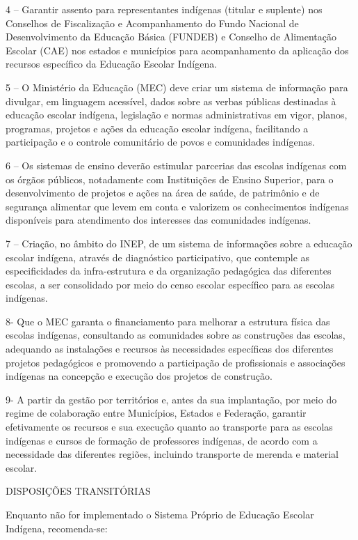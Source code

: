 \documentclass[
]{book}
\begin{document}
4 -- Garantir assento para representantes indígenas (titular e suplente) nos Conselhos de Fiscalização e Acompanhamento do Fundo Nacional de Desenvolvimento da Educação Básica (FUNDEB) e Conselho de Alimentação Escolar (CAE) nos estados e municípios para acompanhamento da aplicação dos recursos específico da Educação Escolar Indígena.

5 -- O Ministério da Educação (MEC) deve criar um sistema de informação para divulgar, em linguagem acessível, dados sobre as verbas públicas destinadas à educação escolar indígena, legislação e normas administrativas em vigor, planos, programas, projetos e ações da educação escolar indígena, facilitando a participação e o controle comunitário de povos e comunidades indígenas.

6 -- Os sistemas de ensino deverão estimular parcerias das escolas indígenas com os órgãos públicos, notadamente com Instituições de Ensino Superior, para o desenvolvimento de projetos e ações na área de saúde, de patrimônio e de segurança alimentar que levem em conta e valorizem os conhecimentos indígenas disponíveis para atendimento dos interesses das comunidades indígenas.

7 -- Criação, no âmbito do INEP, de um sistema de informações sobre a educação escolar indígena, através de diagnóstico participativo, que contemple as especificidades da infra-estrutura e da organização pedagógica das diferentes escolas, a ser consolidado por meio do censo escolar específico para as escolas indígenas.

8- Que o MEC garanta o financiamento para melhorar a estrutura física das escolas indígenas, consultando as comunidades sobre as construções das escolas, adequando as instalações e recursos às necessidades específicas dos diferentes projetos pedagógicos e promovendo a participação de profissionais e associações indígenas na concepção e execução dos projetos de construção.

9- A partir da gestão por territórios e, antes da sua implantação, por meio do regime de colaboração entre Municípios, Estados e Federação, garantir efetivamente os recursos e sua execução quanto ao transporte para as escolas indígenas e cursos de formação de professores indígenas, de acordo com a necessidade das diferentes regiões, incluindo transporte de merenda e material escolar.

DISPOSIÇÕES TRANSITÓRIAS

Enquanto não for implementado o Sistema Próprio de Educação Escolar Indígena, recomenda-se:
\end{document}
